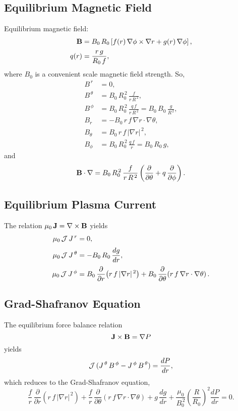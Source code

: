 \documentclass[12pt]{article}
\begin{document}
\subsection{Equilibrium Magnetic Field}
Equilibrium magnetic field:
\begin{align}
{\bf B}& =B_0\,R_0\left[ f(r)\,\nabla\phi\times \nabla r + g(r)\,\nabla\phi\right],\\[0.5ex]
q(r)&= \frac{r\,g}{R_0\,f},
\end{align}
where $B_0$ is a convenient scale magnetic field strength. 
So,
\begin{align}
B^{\,r} &=0,\\[0.5ex]
B^{\,\theta}&=B_0\,R_0^{\,2}\, \frac{f}{r\,R^{\,2}},\\[0.5ex]
B^{\,\phi} &= B_0\,R_0^{\,2}\,\frac{q\,f}{r\,R^{\,2}}= B_0\,B_0\,\frac{g}{R^{\,2}},\\[0.5ex]
B_r&= - B_0\,r\,f\,\nabla r\cdot\nabla\theta,\\[0.5ex]
B_\theta &= B_0\,r\,f\,|\nabla r|^{\,2},\\[0.5ex]
B_\phi &= B_0\,R_0^{\,2}\,\frac{q\,f}{r} = B_0\,R_0\,g,
\end{align}
and
\begin{equation}
{\bf B}\cdot\nabla = B_0\,R_0^{\,2}\,
\frac{f}{r\,R^{\,2}}\left(\frac{\partial}{\partial \theta}+q\,\frac{\partial}{\partial\phi}\right).
\end{equation}

\subsection{Equilibrium Plasma Current}
The relation $\mu_0\,{\bf J} = \nabla\times{\bf B}$ yields 
\begin{align}
\mu_0\,{\cal J}\,J^{\,r}&= 0,\\[0.5ex]
\mu_0\,{\cal J}\,J^{\,\theta} &= - B_0\,R_0\,\frac{dg}{dr},\\[0.5ex]
\mu_0\,{\cal J}\,J^{\,\phi} &= B_0\,\frac{\partial}{\partial r}\!\left(r\,f\,|\nabla r|^{\,2}\right) +B_0\,\frac{\partial}{\partial\theta}\!\left(r\,f\,\nabla r\cdot\nabla\theta\right).
\end{align} 

\subsection{Grad-Shafranov Equation}
The equilibrium force balance relation
\begin{equation}
{\bf J}\times{\bf B} = \nabla P
\end{equation}
yields
\begin{equation}
{\cal J}\,(J^{\,\theta}\,B^{\,\phi}- J^{\,\phi}\,B^{\,\theta})= \frac{dP}{dr},
\end{equation}
which reduces to the Grad-Shafranov equation, 
\begin{equation} 
\frac{f}{r}\,\frac{\partial}{\partial r}\!\left(r\,f\,|\nabla r|^{\,2}\right) + \frac{f}{r}\,\frac{\partial}{\partial \theta}\!\left(r\,f\,\nabla r\cdot\nabla\theta\right) + g\,\frac{dg}{dr} + \frac{\mu_0}{B_0^{\,2}}\left(\frac{R}{R_0}\right)^2\frac{dP}{dr} = 0.
\end{equation}
\end{document}
